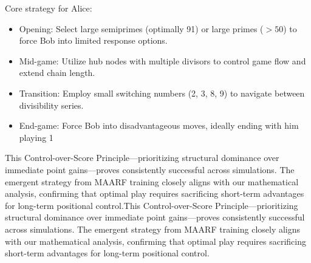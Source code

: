 \documentclass[twocolumn, a4paper]{article}
\begin{document}
Core strategy for Alice:
\begin{itemize}
  \item Opening: Select large semiprimes (optimally 91) or large primes ($>50$) to force Bob into limited response options.
  \item Mid-game: Utilize hub nodes with multiple divisors to control game flow and extend chain length.
  \item Transition: Employ small switching numbers (2, 3, 8, 9) to navigate between divisibility series.
  \item End-game: Force Bob into disadvantageous moves, ideally ending with him playing 1
\end{itemize}

This Control-over-Score Principle—prioritizing structural dominance over immediate point gains—proves consistently successful across simulations. The emergent strategy from MAARF training closely aligns with our mathematical analysis, confirming that optimal play requires sacrificing short-term advantages for long-term positional control.This Control-over-Score Principle—prioritizing structural dominance over immediate point gains—proves consistently successful across simulations. The emergent strategy from MAARF training closely aligns with our mathematical analysis, confirming that optimal play requires sacrificing short-term advantages for long-term positional control.
\end{document}
